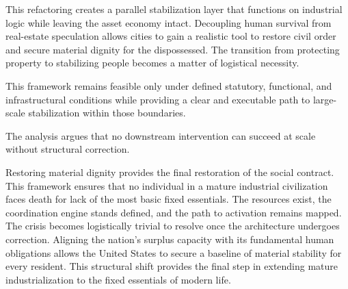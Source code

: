 \documentclass[12pt, letterpaper]{article}
\begin{document}
This refactoring creates a parallel stabilization layer that functions on industrial logic while leaving the asset economy intact. Decoupling human survival from real-estate speculation allows cities to gain a realistic tool to restore civil order and secure material dignity for the dispossessed. The transition from protecting property to stabilizing people becomes a matter of logistical necessity.

This framework remains feasible only under defined statutory, functional, and infrastructural conditions while providing a clear and executable path to large-scale stabilization within those boundaries.

The analysis argues that no downstream intervention can succeed at scale without structural correction.

Restoring material dignity provides the final restoration of the social contract. This framework ensures that no individual in a mature industrial civilization faces death for lack of the most basic fixed essentials. The resources exist, the coordination engine stands defined, and the path to activation remains mapped. The crisis becomes logistically trivial to resolve once the architecture undergoes correction. Aligning the nation's surplus capacity with its fundamental human obligations allows the United States to secure a baseline of material stability for every resident. This structural shift provides the final step in extending mature industrialization to the fixed essentials of modern life.

\newpage
{}

\nocite{*}

\end{document}
